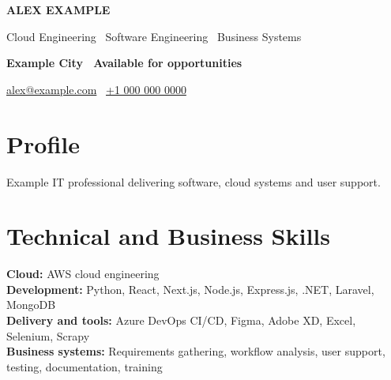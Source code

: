 \documentclass[10pt,a4paper]{article}
\begin{document}
{\fontsize{27}{29}\selectfont\bfseries\color{navy} ALEX EXAMPLE}\par
\vspace{5pt}
{\large Cloud Engineering \textbar\ Software Engineering \textbar\ Business Systems}\par
\vspace{5pt}
\textbf{Example City \textbar\ Available for opportunities}\par
\vspace{3pt}
\href{mailto:alex@example.com}{alex@example.com}
\textbar\ \href{tel:+10000000000}{+1 000 000 0000}

\section{Profile}
Example IT professional delivering software, cloud systems and user support.

\section{Technical and Business Skills}
\textbf{Cloud:} AWS cloud engineering\\
\textbf{Development:} Python, React, Next.js, Node.js, Express.js, .NET, Laravel, MongoDB\\
\textbf{Delivery and tools:} Azure DevOps CI/CD, Figma, Adobe XD, Excel, Selenium, Scrapy\\
\textbf{Business systems:} Requirements gathering, workflow analysis, user support, testing, documentation, training
\end{document}
